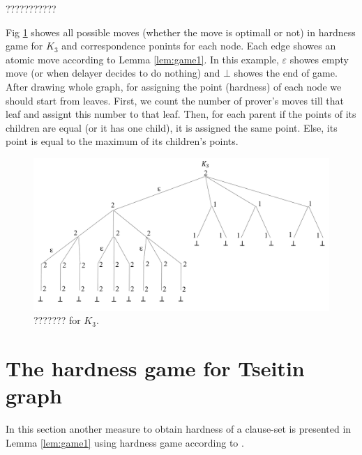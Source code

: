 \documentclass[12pt]{book}
\begin{document}
	\begin{examp}\label{exp:gg1}
      ???????????
	  
	  Fig \ref{fig:gg1} showes all possible moves (whether the move is optimall or not) in hardness game for $K_3$ and correspondence ponints
	  for each node.
	  Each edge showes an atomic move according to Lemma \ref{lem:game1}. In this example, $\varepsilon $ showes empty move 
	  (or when delayer decides to do nothing) and $\bot$ showes the end of game.
	  After drawing whole graph, for assigning the point (hardness) of each node we should start from leaves. First, 
	  we count the number of prover's moves till that leaf and assignt this number to that leaf. Then, for each parent if the 
	  points of its children are equal (or it has one child), it is assigned the same point. Else, its point is equal to the maximum of its children's 
	  points.
	  \begin{figure}
      \begin{center}
      \includegraphics[scale =0.6]{gg1.png}
      \caption{??????? for $K_3$.}
	  \label{fig:gg1}
      \end{center}
      \end{figure}

\end{examp}  

\section{The hardness game for Tseitin graph}
\label{sec:Hardness Tseitin}	  

In this section another measure to obtain hardness of a clause-set is presented in Lemma \ref{lem:game1} using hardness game according to \cite{h5}.
\end{document}
